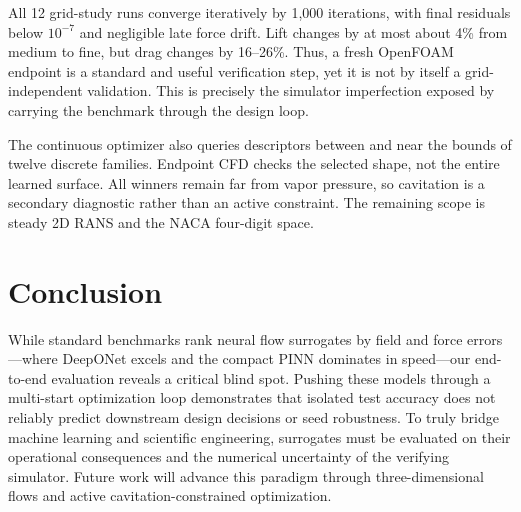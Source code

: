 \documentclass{article}
\begin{document}
All 12 grid-study runs converge iteratively by 1,000 iterations, with final
residuals below $10^{-7}$ and negligible late force drift. Lift changes by at
most about 4\% from medium to fine, but drag changes by 16--26\%. Thus, a fresh
OpenFOAM endpoint is a standard and useful verification step, yet it is not by
itself a grid-independent validation. This is precisely the simulator
imperfection exposed by carrying the benchmark through the design loop.

The continuous optimizer also queries descriptors between and near the bounds
of twelve discrete families. Endpoint CFD checks the selected shape, not the
entire learned surface. All winners remain far from vapor pressure, so
cavitation is a secondary diagnostic rather than an active constraint. The
remaining scope is steady 2D RANS and the NACA four-digit space.

\section{Conclusion}
While standard benchmarks rank neural flow surrogates by field and force errors---where DeepONet excels and the compact PINN dominates in speed---our end-to-end evaluation reveals a critical blind spot. Pushing these models through a multi-start optimization loop demonstrates that isolated test accuracy does not reliably predict downstream design decisions or seed robustness. To truly bridge machine learning and scientific engineering, surrogates must be evaluated on their operational consequences and the numerical uncertainty of the verifying simulator. Future work will advance this paradigm through three-dimensional flows and active cavitation-constrained optimization.




\appendix
\end{document}
